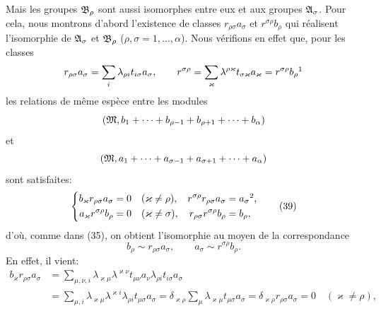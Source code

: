 Mais les groupes $\mathfrak{B}_\rho$ sont aussi isomorphes entre eux et aux groupes $\mathfrak{A}_\sigma$. Pour cela, nous montrons d'abord l'existence de classes $r_{\rho\sigma}a_\sigma$ et $r^{\sigma\rho}b_\rho$ qui réalisent l'isomorphie de $\mathfrak{A}_\sigma$ et $\mathfrak{B}_\rho$ ($\rho,\sigma=1,\ldots,\alpha$). Nous vérifions en effet que, pour les classes
\[
 r_{\rho\sigma}a_\sigma=\sum_i\lambda_{\rho i}t_{i\sigma}a_\sigma,
 \qquad
 r^{\sigma\rho}=\sum_\varkappa\lambda^{\rho\varkappa}t_{\sigma\varkappa}a_\varkappa
 =r^{\sigma\rho}b_\rho\footnotemark
\]
les relations \og{} de même espèce \fg{} entre les modules
\[
 (\mathfrak{M},b_1+\cdots+b_{\rho-1}+b_{\rho+1}+\cdots+b_\alpha)
\]
et
\[
 (\mathfrak{M},a_1+\cdots+a_{\sigma-1}+a_{\sigma+1}+\cdots+a_\alpha)
\]
sont satisfaites:
\begin{equation}
\left\{
\begin{aligned}
 b_\varkappa r_{\rho\sigma}a_\sigma&=0 &&(\varkappa\ne\rho),&
 r^{\sigma\rho}r_{\rho\sigma}a_\sigma&=a_\sigma\footnotemark,\\
 a_\varkappa r^{\sigma\rho}b_\rho&=0 &&(\varkappa\ne\sigma),&
 r_{\rho\sigma}r^{\sigma\rho}b_\rho&=b_\rho,
\end{aligned}\right.
\tag{39}
\end{equation}
d'où, comme dans (35), on obtient l'isomorphie au moyen de la correspondance
\begin{equation}
 b_\rho\sim r_{\rho\sigma}a_\sigma,
 \qquad
 a_\sigma\sim r^{\sigma\rho}b_\rho.
\tag{40}
\end{equation}
En effet, il vient:
\[
\begin{aligned}
 b_\varkappa r_{\rho\sigma}a_\sigma
 &=\sum_{\mu,\nu,i}\lambda_{\varkappa\mu}\lambda^{\varkappa\nu}t_{\mu\nu}a_\nu\lambda_{\rho i}t_{i\sigma}a_\sigma\\
 &=\sum_{\mu,i}\lambda_{\varkappa\mu}\lambda^{\varkappa i}\lambda_{\rho i}t_{\mu\sigma}a_\sigma
 =\delta_{\varkappa\rho}\sum_\mu\lambda_{\varkappa\mu}t_{\mu\sigma}a_\sigma
 =\delta_{\varkappa\rho}r_{\rho\sigma}a_\sigma=0\quad(\varkappa\ne\rho),
\end{aligned}
\]
